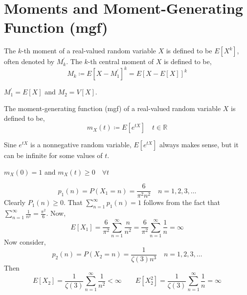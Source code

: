 \section{Moments and Moment-Generating Function (mgf)}
\begin{definition}
    The $k$-th moment of a real-valued random variable $X$ is defined to be
$E[X^k]$, often denoted by $M_k^\prime$. The $k$-th central moment of $X$ is
defined to be,
    \[ M_k \coloneqq E[X - M_1^\prime]^k = E[X- E[X]]^k                      \]
\end{definition}
\note $M_1^\prime = E[X]$ and $M_2 = V[X]$.

\begin{definition}
    The moment-generating function (mgf) of a real-valued random variable $X$
is defined to be,
    \[ m_X(t) \coloneqq E[e^{tX}] \quad t \in \mathbb{R}                     \]
\end{definition}
\note Sine $e^{tX}$ is a nonnegative random variable, $E[e^{tX}]$ always makes
sense, but it can be infinite for some values of $t$.

\note $m_X(0) = 1$ and $m_X(t) \geq 0 \quad \forall t$

\begin{example}
\[ p_1(n) = P(X_1 = n) = \frac{6}{\pi^2 n^2} \quad n = 1, 2, 3, \dots       \]
Clearly $P_1(n) \geq 0$. That $\sum_{n = 1}^\infty p_1(n) = 1$ follows from the
fact that $\sum_{n = 1}^\infty \frac{1}{n^2} = \frac{\pi^2}{6}$. Now,
\[ E[X_1] = \frac{6}{\pi^2} \sum_{n = 1}^\infty \frac{n}{n^2}
          = \frac{6}{\pi^2} \sum_{n = 1}^\infty \frac{1}{n}
          = \infty                                                          \]
Now consider,
\[ p_2(n) = P(X_2 = n) = \frac{1}{\zeta(3) n^3} \quad n = 1, 2, 3, \dots    \]
Then
\[  E[X_2] = \frac{1}{\zeta(3)} \sum_{n = 1}^\infty \frac{1}{n^2} < \infty
    \qquad
    E[X_2^2] = \frac{1}{\zeta(3)} \sum_{n = 1}^\infty \frac{1}{n} = \infty  \]
\end{example}

